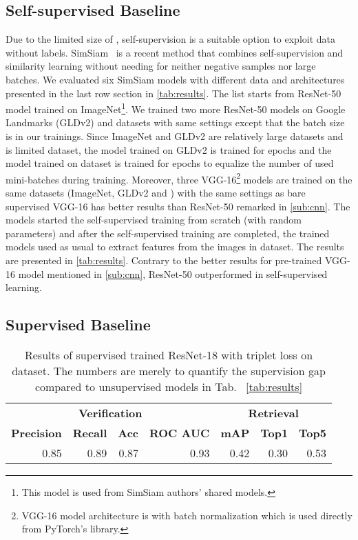 \documentclass[a4paper,conference]{IEEEtran}
\begin{document}
\subsection{Self-supervised Baseline}
\label{sub:self}
Due to the limited size of \amstertime, self-supervision is a suitable option to exploit data without labels. SimSiam~\cite{chen2020simsiam} is a recent method that combines self-supervision and similarity learning without needing for neither negative samples nor large batches. We evaluated six SimSiam models with different data and architectures presented in the last row section in \cref{tab:results}. The list starts from ResNet-50 model trained on ImageNet\footnote{This model is used from SimSiam authors' shared models.}. We trained two more ResNet-50 models on Google Landmarks (GLDv2) and \amstertime datasets with same settings except that the batch size is  in our trainings. Since ImageNet and GLDv2 are relatively large datasets and \amstertime is limited dataset, the model trained on GLDv2 is trained for  epochs and the model trained on \amstertime dataset is trained for  epochs to equalize the number of used mini-batches during training. Moreover, three VGG-16\footnote{VGG-16 model architecture is with batch normalization which is used directly from PyTorch's library.} models are trained on the same datasets (ImageNet, GLDv2 and \amstertime) with the same settings as bare supervised VGG-16 has better results than ResNet-50 remarked in \cref{sub:cnn}. The models started the self-supervised training from scratch (with random parameters) and after the self-supervised training are completed, the trained models used as usual to extract features from the images in \amstertime dataset. The results are presented in \cref{tab:results}. Contrary to the better results for pre-trained VGG-16 model mentioned in \cref{sub:cnn}, ResNet-50 outperformed in self-supervised learning.


\subsection{Supervised Baseline}
\label{sub:supervision}

\begin{table}
\caption{Results of supervised trained ResNet-18 with triplet loss \cite{balntas2016learning} on \amstertime dataset. The numbers are merely to quantify the supervision gap compared to unsupervised models in Tab.~ \ref{tab:results}  }
\label{tab:supervised_results}
\centering
\begin{tabular}{rrrrrrr} \toprule
\multicolumn{4}{c}{\textbf{Verification}} & \multicolumn{3}{c}{\textbf{Retrieval}} \\
\cmidrule(r){1-4} \cmidrule(l){5-7}
\textbf{Precision} & \textbf{Recall} & \textbf{Acc} & \textbf{ROC AUC} & \textbf{mAP} & \textbf{Top1} & \textbf{Top5} \\ \midrule
0.85 & 0.89 & 0.87 & 0.93 & 0.42 & 0.30 & 0.53 \\ \bottomrule
\end{tabular}
\end{table}
\end{document}
